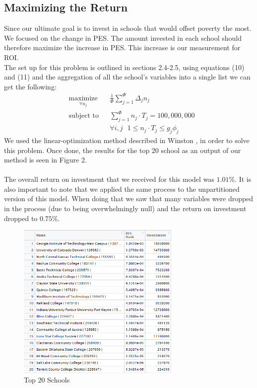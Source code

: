 \documentclass[12pt]{scrartcl}
\begin{document}
	\subsection{Maximizing the Return}
		Since our ultimate goal is to invest in schools that would offset poverty the most. We focused on the change in PES. The amount invested in each school should therefore maximize the increase in PES. This increase is our measurement for ROI.\\
		The set up for this problem is outlined in sections 2.4-2.5, using equations (10) and (11) and the aggregation of all the school's variables into a single list we can get the following:
		\begin{equation*}
				\begin{aligned}
					& \underset{\forall n_j}{\text{maximize}}
					& &\frac{ 1  }{ \Phi }\sum_{j=1}^\Phi \Delta_j n_j\\
					& \text{subject to}
					& & \sum_{j=1}^\Phi n_j\cdot T_j = 100,000,000\\
					&&& \forall i,j \ \ \ 1\le n_j\cdot T_j \le g_j\phi_j
				\end{aligned}	
		\end{equation*}
		We used the linear-optimization method described in Winston \cite{Winston}, in order to solve this problem. Once done, the results for the top 20 school as an output of our method is seen in Figure 2.
		\\
		\\
		The overall return on investment that we received for this model was $1.01$\%. It is also important to note that we applied the same process to the unpartitioned version of this model. When doing that we saw that many variables were dropped in the process (due to being overwhelmingly null) and the return on investment dropped to $0.75$\%.
		\begin{figure}[H]
			\centering
			\includegraphics[width=0.7\textwidth]{final.png}
			\caption{Top 20 Schools}
			\label{fig:top20}
		\end{figure}	
\end{document}
